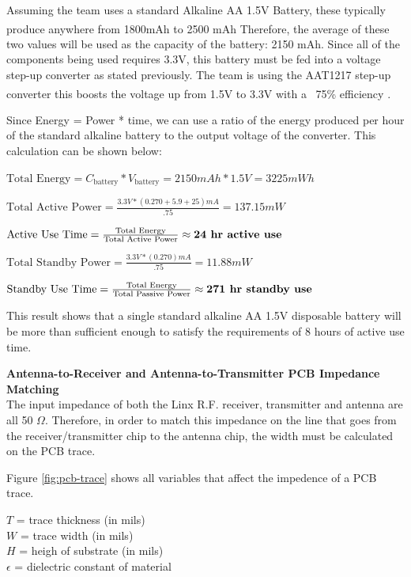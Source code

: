 \documentclass[letterpaper,10pt]{article}
\begin{document}
\begin{spacing}{1.15}
Assuming the team uses a standard Alkaline AA 1.5V Battery, these typically produce anywhere from 1800mAh to 2500 mAh \textsuperscript{\cite{Battery}} Therefore, the average of these two values will be used as the capacity of the battery: 2150 mAh. Since all of the components being used requires 3.3V, this battery must be fed into a voltage step-up converter as stated previously. The team is using the AAT1217 step-up converter this boosts the voltage up from 1.5V to 3.3V with a ~75\% efficiency \textsuperscript{\cite{AAT1217}}.

Since Energy = Power * time, we can use a ratio of the energy produced per hour of the standard alkaline battery to the output voltage of the converter. This calculation can be shown below:



\begin{center} 
	$\textrm{Total Energy} = C_\textrm{battery} * V_\textrm{battery} = 2150 mAh * 1.5V = 3225 mWh$
	
	$\textrm{Total Active Power} = \frac{3.3 V * (0.270 + 5.9 + 25) mA}{.75} = 137.15mW$ 
	
	$\textrm{Active Use Time} = \frac{\textrm{Total Energy}}{\textrm{Total Active Power}} \approx \textrm{\textbf{24 hr active use}}$
	
	$\textrm{Total Standby Power} = \frac{3.3 V * (0.270) mA}{.75} = 11.88 mW$
	
	$\textrm{Standby Use Time} = \frac{\textrm{Total Energy}}{\textrm{Total Passive Power}} \approx \textrm{\textbf{271 hr  standby use}}$
\end{center}

This result shows that a single standard alkaline AA 1.5V disposable battery will be more than sufficient enough to satisfy the requirements of 8 hours of active use time.

\normalsize\textbf{Antenna-to-Receiver and Antenna-to-Transmitter PCB Impedance Matching} \\
The input impedance of both the Linx R.F. receiver, transmitter and antenna are all 50 $\Omega$. Therefore, in order to match this impedance on the line that goes from the receiver/transmitter chip to the antenna chip, the width must be calculated on the PCB trace. 

Figure \ref{fig:pcb-trace} shows all variables that affect the impedence of a PCB trace. 

\begin{center}
	$T $ = trace thickness (in mils) \\
	$W$ = trace width  (in mils) \\
	$H$ = heigh of substrate (in mils) \\
	$\epsilon$ = dielectric constant of material
\end{center}


\end{spacing}
\end{document}
